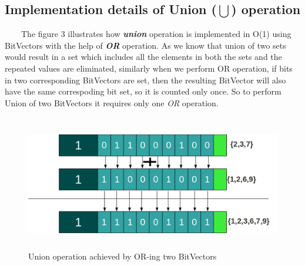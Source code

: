 \documentclass[12pt,a4paper]{article}
\begin{document}
\subsection{Implementation details of Union ($\bigcup$) operation}
\ \ \ \ The figure 3 illustrates how \textit{\textbf{union}} operation is implemented in O(1) using BitVectors with the help of \textbf{\textit{OR}} operation. As we know that union of two sets would result in a set which includes all the elements in both the sets and the repeated values are eliminated, similarly when we perform OR operation, if bits in two corresponding BitVectors are set, then the resulting BitVector will also have the same correspoding bit set, so it is counted only once. So to perform Union of two BitVectors it requires only one \textit{OR} operation.
\begin{figure}[H]
\begin{center}
\ \newline
\includegraphics[height=50mm, scale=.5]{union.png}
\caption{Union operation achieved by OR-ing two BitVectors}
\end{center}
\end{figure}
\end{document}
